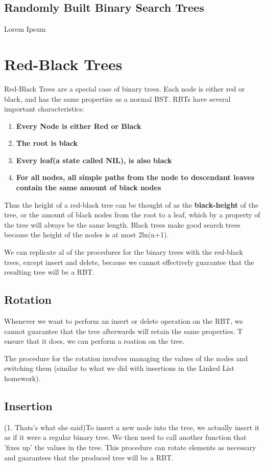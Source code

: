 \documentclass{article}
\begin{document}
\subsection{Randomly Built Binary Search Trees}
Lorem Ipsum
\section{Red-Black Trees}
Red-Black Trees are a special case of binary trees. Each node is either red or black, and has the same 
properties as a normal BST. RBTs have several important characteristics:
\begin{enumerate}
		\item{\textbf{Every Node is either Red or Black}}
		\item{\textbf{The root is black}}
		\item{\textbf{Every leaf(a state called NIL), is also black}}
		\item{\textbf{For all nodes, all simple paths from the node to descendant leaves
				contain the same amount of black nodes}}
\end{enumerate}

Thus the height of a red-black tree can be thought of as the \textbf{black-height} of the tree, or the amount
of black nodes from the root to a leaf, which by a property of the tree will always be the same length.
Black trees make good search trees because the height of the nodes is at most 2ln(n+1).

We can replicate al of the procedures for the binary trees with the red-black trees, except insert and delete, 
because we cannot effectively guarantee that the resulting tree will be a RBT.

\subsection{Rotation}
Whenever we want to perform an insert or delete operation on the RBT, we cannot guarantee that the tree afterwards
will retain the same properties. T ensure that it does, we can perform a roation on the tree. 

The procedure for the rotation involves managing the values of the nodes and switching them (similar to what we
did with insertions in the Linked List homework).
\subsection{Insertion}
(1. Thats's what she said)To insert a new node into the tree, we actually insert it as if it were a regular
binary tree. We then need to call another function that 'fixes up' the values in the tree. This procedure can
rotate elements as necessary and guarantees that the produced tree will be a RBT.
\end{document}

